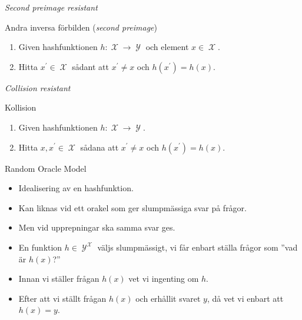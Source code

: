 \documentclass{beamer}
\theoremstyle{definition}
\DeclareMathOperator{\X}{\mathcal{X}}
\DeclareMathOperator{\Y}{\mathcal{Y}}
\begin{document}
\begin{frame}{\insertsubsectionhead}{\emph{Second preimage resistant}}
  \begin{block}{Andra inversa förbilden (\emph{second preimage})}
    \begin{enumerate}
      \item Given hashfunktionen \(h\colon \X\to \Y\) och element \(x\in \X\).
      \item Hitta \(x^\prime\in \X\) sådant att \(x^\prime\neq x\) och 
        \(h(x^\prime) = h(x)\).
    \end{enumerate}
  \end{block}
\end{frame}

\begin{frame}{\insertsubsectionhead}{\emph{Collision resistant}}
  \begin{block}{Kollision}
    \begin{enumerate}
      \item Given hashfunktionen \(h\colon \X\to \Y\).
      \item Hitta \(x, x^\prime\in \X\) sådana att \(x^\prime\neq x\) och 
        \(h(x^\prime) = h(x)\).
    \end{enumerate}
  \end{block}
\end{frame}

\begin{frame}{\insertsubsectionhead}{Random Oracle Model}
  \begin{itemize}
    \item Idealisering av en hashfunktion.

    \item Kan liknas vid ett orakel som ger slumpmässiga svar på frågor.

    \item Men vid upprepningar ska samma svar ges.

    \item En funktion \(h\in \Y^{\X}\) väljs slumpmässigt, vi får enbart ställa 
      frågor som ''vad är \(h(x)\)?''

    \item Innan vi ställer frågan \(h(x)\) vet vi ingenting om \(h\).

    \item Efter att vi ställt frågan \(h(x)\) och erhållit svaret \(y\), då vet 
      vi enbart att \(h(x) = y\).

  \end{itemize}
\end{frame}
\end{document}
